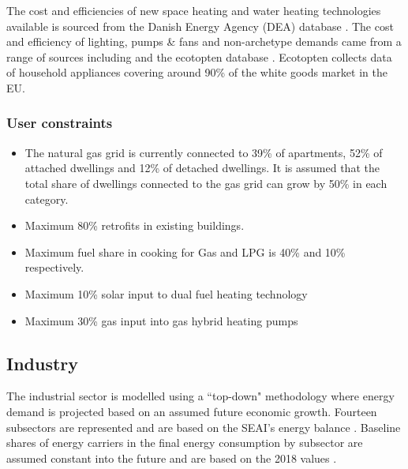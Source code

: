 \documentclass[journal abbreviation, manuscript]{copernicus}
\begin{document}
The cost and efficiencies of new space heating and water heating technologies available is sourced from the Danish Energy Agency (DEA) database \citep{Energinet2018}. The cost and efficiency of lighting, pumps \& fans and non-archetype demands came from a range of sources including
\citep{SEAISustainableAuthorityofIreland2018} and the ecotopten database \citep{ecotopten}. Ecotopten collects data of household appliances covering around 90\% of the white goods market in the EU.

\subsubsection{User constraints}
\begin{itemize}
 \item The natural gas grid is currently connected to 39\% of apartments, 52\% of attached dwellings and 12\% of detached dwellings. It is assumed that the total share of dwellings connected to the gas grid can grow by 50\% in each category. 
\item Maximum 80\% retrofits in existing buildings.
\item Maximum fuel share in cooking for Gas and LPG is 40\% and 10\% respectively.
\item Maximum 10\% solar input to dual fuel heating technology
\item Maximum 30\% gas input into gas hybrid heating pumps

\end{itemize}



\subsection{Industry}
\label{ss:industry}
The industrial sector is modelled using a ``top-down" methodology where energy demand is projected based on an assumed future economic growth. Fourteen subsectors are represented and are based on the SEAI's energy balance \citep{SEAI2019}. Baseline shares of energy carriers in the final energy consumption by subsector are assumed constant into the future and are based on the 2018 values \citep{SEAI2019}. 
\end{document}

